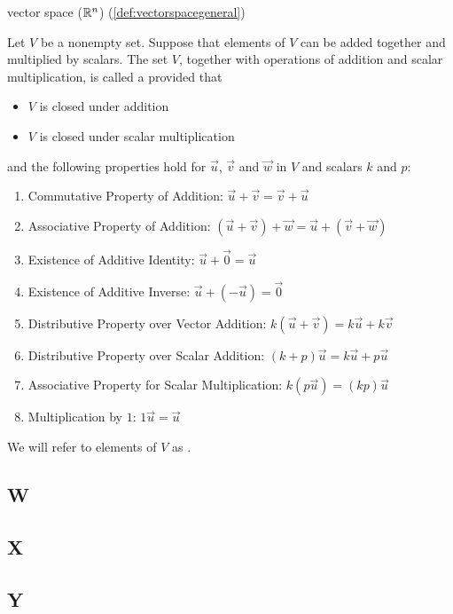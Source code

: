 \documentclass{ximera}
\begin{document}
vector space (\href{https://ximera.osu.edu/linearalgebradzv3/LinearAlgebraInteractiveIntro/VSP-0020/main}{$\mathbb{R}^n$})
(\ref{def:vectorspacegeneral})
\begin{expandable}{}{}
    Let $V$ be a nonempty set.  Suppose that elements of $V$ can be added together and multiplied by scalars.  The set $V$, together with operations of addition and scalar multiplication, is called a  provided that 
  \begin{itemize}
  \item[] $V$ is closed under addition
  \item[] $V$ is closed under scalar multiplication
  \end{itemize}
  and the following properties hold for $\vec{u}$, $\vec{v}$ and $\vec{w}$ in $V$ and scalars $k$ and $p$:
  \begin{enumerate}
   \item 
  Commutative Property of Addition:\quad
  $\vec{u}+\vec{v}=\vec{v}+\vec{u}$
  \item 
  Associative Property of Addition:\quad
  $(\vec{u}+\vec{v})+\vec{w}=\vec{u}+(\vec{v}+\vec{w})$
  \item 
  Existence of Additive Identity:\quad
  $\vec{u}+\vec{0}=\vec{u}$
  \item 
  Existence of Additive Inverse:\quad
  $\vec{u}+(-\vec{u})=\vec{0}$
  \item 
  Distributive Property over Vector Addition:\quad
  $k(\vec{u}+\vec{v})=k\vec{u}+k\vec{v}$
  \item 
  Distributive Property over Scalar Addition:\quad
  $(k+p)\vec{u}=k\vec{u}+p\vec{u}$
  \item 
  Associative Property for Scalar Multiplication:\quad
  $k(p\vec{u})=(kp)\vec{u}$
  \item 
  Multiplication by $1$:\quad
  $1\vec{u}=\vec{u}$
  \end{enumerate}
We will refer to elements of $V$ as .  
\end{expandable}

\subsection*{W}

\subsection*{X}

\subsection*{Y}
\end{document}
